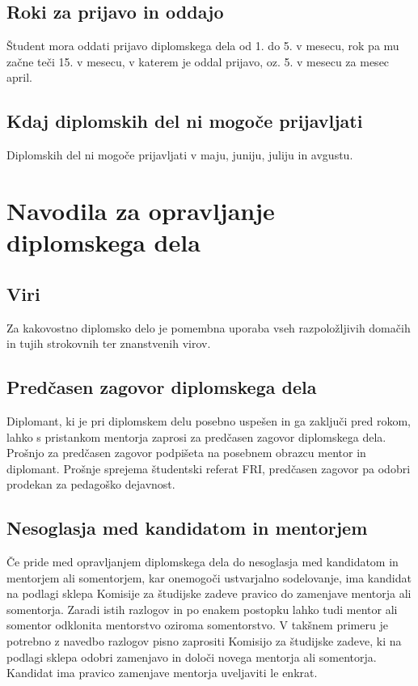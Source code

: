 \documentclass[12pt,a4paper,openany]{book}
\begin{document}
\section{Roki za prijavo in oddajo} 
Študent mora oddati prijavo diplomskega dela od 1. do 5. v mesecu, rok pa mu začne teči 15. v mesecu, 
v katerem je oddal prijavo, oz. 5. v mesecu za mesec april.

\section{Kdaj diplomskih del ni mogoče prijavljati} 
Diplomskih del ni mogoče prijavljati v maju, juniju, juliju in avgustu.



\chapter{Navodila za opravljanje diplomskega dela}

\section{Viri}
Za kakovostno diplomsko delo je pomembna uporaba vseh razpoložljivih doma\-čih in tujih strokovnih ter znanstvenih virov.

\section{Predčasen zagovor diplomskega dela}
Diplomant, ki je pri diplomskem delu posebno uspešen in ga zaključi pred rokom, lahko s pristankom mentorja zaprosi za 
predčasen zagovor diplomskega dela. Prošnjo za predčasen zagovor podpišeta na posebnem obrazcu mentor in diplomant. Prošnje sprejema študentski
referat FRI, predčasen zagovor pa odobri prodekan za pedagoško dejavnost.

\section{Nesoglasja med kandidatom in mentorjem}
Če pride med opravljanjem diplomskega dela do nesoglasja med kandidatom in mentorjem ali somentorjem, 
kar onemogoči ustvarjalno sodelovanje, ima kandidat na podlagi sklepa Komisije za študijske zadeve pravico do zame\-nja\-ve mentorja ali
somentorja. Zaradi istih razlogov in po enakem postopku lahko tudi mentor ali somentor odklonita mentorstvo oziroma somentorstvo. V takšnem
primeru je potrebno z navedbo razlogov pisno zaprositi Komisijo za študijske zadeve, ki na podlagi sklepa odobri zamenjavo in določi novega
mentorja ali somentorja. Kandidat ima pravico zamenjave mentorja uveljaviti le enkrat.
\end{document}
